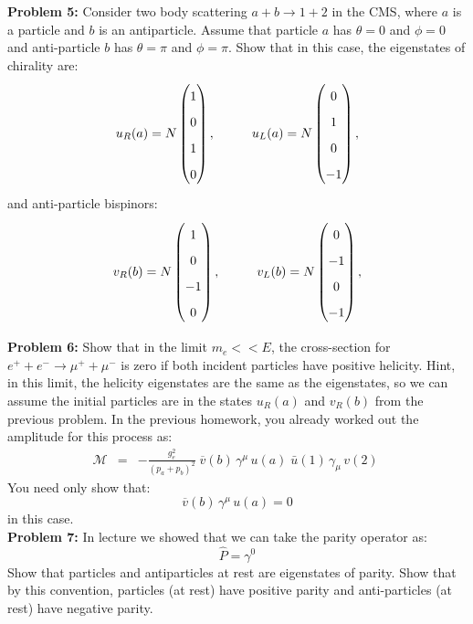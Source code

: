 \documentclass[12pt]{article}
\begin{document}
\noindent
{\bf Problem 5:}  Consider two body scattering $a + b \to 1 + 2$ in the CMS, where $a$ is a particle and $b$ is an antiparticle.  Assume that particle $a$ has $\theta=0$ and $\phi=0$ and anti-particle $b$ has $\theta=\pi$ and $\phi=\pi$.  Show that in this case, the eigenstates of chirality are:
$$\def\arraystretch{1.7}
u_R(a) = N \begin{pmatrix} 1 \\ 0 \\ 1 \\ 0  \end{pmatrix}, \hspace{1cm}
u_L(a) = N \begin{pmatrix} 0 \\ 1 \\ 0 \\ -1 \end{pmatrix},
$$
and anti-particle bispinors:
$$\def\arraystretch{1.7}
v_R(b) = N \begin{pmatrix} 1 \\ 0 \\ -1 \\ 0  \end{pmatrix}, \hspace{1cm}
v_L(b) = N \begin{pmatrix} 0 \\ -1 \\ 0 \\ -1 \end{pmatrix},
$$

\newpage


\noindent
{\bf Problem 6:} Show that in the limit $m_e << E$, the cross-section for $e^+ + e^- \to \mu^+ + \mu^-$ is zero if both incident particles have positive helicity. Hint, in this limit, the helicity eigenstates are the same as the eigenstates, so we can assume the initial particles are in the states $u_R(a)$ and $v_R(b)$ from the previous problem.  In the previous homework, you already worked out the amplitude for this process as:
\begin{eqnarray*}
\mathcal{M}  &=&  -\frac{g_e^2}{(p_a+p_b)^2} \; \overline{v}(b) \, \gamma^\mu
  \, u(a)  \; \bar{u}(1) \, \gamma_\mu \, v(2) \; 
\end{eqnarray*}
You need only show that:
$$\overline{v}(b) \, \gamma^\mu \, u(a) = 0$$
in this case.\\[5pt]

\noindent
{\bf Problem 7:}
In lecture we showed that we can take the parity operator as:
$$\hat{P} = \gamma^0$$
Show that particles and antiparticles at rest are eigenstates of
parity.  Show that by this convention, particles (at rest) have
positive parity and anti-particles (at rest) have negative parity.
\end{document}
